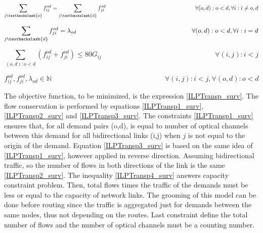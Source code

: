 \begin{equation}
\sum_{j\textbackslash \{o\}} f_{ij}^{od} = \sum_{j\textbackslash \{d\}} f_{ji}^{od} \qquad \qquad \qquad \qquad \qquad \qquad \qquad \qquad
\forall(o,d) : o < d, \forall i: i \neq o,d
\label{ILPTransp2_surv}
\end{equation}

\begin{equation}
\sum_{j\textbackslash \{d\}} f_{ji}^{od} = \lambda_{od}  \qquad \qquad \qquad \qquad \qquad \qquad \qquad \qquad \qquad
\forall(o,d) : o < d, \forall i: i = d
\label{ILPTransp3_surv}
\end{equation}

\begin{equation}
\sum_{(o,d):o<d} \left(f_{ij}^{od} + f_{ji}^{od}\right) \leq 80 G_{ij} \qquad \qquad \qquad \qquad \qquad \qquad \qquad \qquad
\forall(i,j) : i < j
\label{ILPTransp4_surv}
\end{equation}

\begin{equation}
f_{ij}^{od} , f_{ji}^{od} , \lambda_{od} \in \mathbb{N}   \qquad \qquad \qquad \qquad \qquad \qquad \qquad \qquad
\forall(i,j) : i < j, \forall(o,d) : o < d
\label{ILPTransp5_surv}
\end{equation}

\vspace{10pt}

The objective function, to be minimized, is the expression \ref{ILPTransp_surv}. The flow conservation is performed by equations \ref{ILPTransp1_surv}, \ref{ILPTransp2_surv} and \ref{ILPTransp3_surv}. The constraints \ref{ILPTransp1_surv} ensures that, for all demand pairs (o,d), is equal to number of optical channels between this demand for all bidirectional links (i,j) when $j$ is not equal to the origin of the demand. Equation \ref{ILPTransp3_surv} is based on the same idea of \ref{ILPTransp1_surv}, however applied in reverse direction. Assuming bidirectional traffic, so the number of flows in both directions of the link is the same \ref{ILPTransp2_surv}. The inequality \ref{ILPTransp4_surv} answers capacity constraint problem. Then, total flows times the traffic of the demands must be less or equal to the capacity of network links. The grooming of this model can be done before routing since the traffic is aggregated just for demands between the same nodes, thus not depending on the routes. Last constraint define the total number of flows and the number of optical channels must be a counting number.

